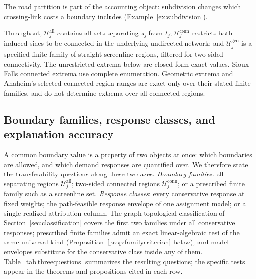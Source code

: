 \documentclass[a4paper,fleqn]{cas-sc}
\begin{document}
The road partition is part of the accounting object: subdivision changes
which crossing-link costs a boundary includes (Example~\ref{ex:subdivision}).

Throughout, $\mathcal U_j^{\mathrm{all}}$ contains all sets separating
$s_j$ from $t_j$; $\mathcal U_j^{\mathrm{conn}}$ restricts both induced sides
to be connected in the underlying undirected network; and
$\mathcal U_j^{\mathrm{geo}}$ is a specified finite family of straight
screenline regions, filtered for two-sided connectivity.
The unrestricted extrema below are closed-form exact values. Sioux Falls
connected extrema use complete enumeration. Geometric extrema and Anaheim's
selected connected-region ranges are exact only over their stated finite
families, and do not determine extrema over all connected regions.

\subsection{Boundary families, response classes, and explanation accuracy}\label{sec:levels}\label{sec:hierarchy}
A common boundary value is a property of two objects at once: which
boundaries are allowed, and which demand responses are quantified over.
We therefore state the transferability questions along these two axes.
\emph{Boundary families}: all separating regions
$\mathcal U_j^{\mathrm{all}}$; two-sided connected regions
$\mathcal U_j^{\mathrm{conn}}$; or a prescribed finite family such as a
screenline set. \emph{Response classes}: every conservative response at
fixed weights; the path-feasible response envelope of one assignment model;
or a single realized attribution column. The graph-topological
classification of Section~\ref{sec:classification} covers the first two
families under all conservative responses; prescribed finite families
admit an exact linear-algebraic test of the same universal kind
(Proposition~\ref{prop:familycriterion} below), and model envelopes
substitute for the conservative class inside any of them.
Table~\ref{tab:threequestions} summarizes the resulting questions; the
specific tests appear in the theorems and propositions cited in each
row.
\end{document}
